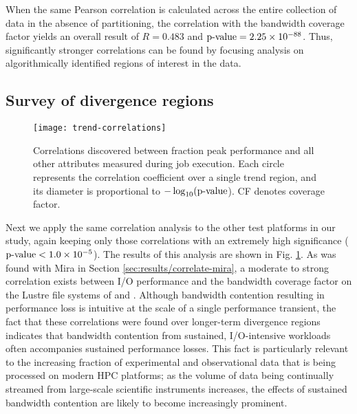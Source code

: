 When the same Pearson correlation is calculated across the entire collection
of \mira \mirafsone data in the absence of partitioning, the correlation with the bandwidth coverage factor
yields an overall result of $R = 0.483$ and $\textup{p-value} =
2.25\times 10^{-88}$.  
Thus, significantly stronger correlations can be found by focusing analysis on algorithmically identified regions of
interest in the data.

\subsection{Survey of divergence regions} \label{sec:results/correlate-all}

\begin{figure}
    \centering
    \texttt{[image: trend-correlations]}
    \vspace{-.35in}
    \caption{Correlations discovered between fraction peak performance and all other attributes measured during job execution.
    Each circle represents the correlation coefficient over a single trend region, and its diameter is proportional to $-\log_{10}(\textup{p-value}$).
    CF denotes coverage factor.}
    \label{fig:trend-correlations}
    \vspace{-.15in}
\end{figure}

Next we apply the same correlation analysis to the other test platforms in our study, again  keeping only those correlations with an extremely high significance ($\textup{p-value} < {1.0 \times 10^{-5}}$). The results of this analysis are shown in Fig. \ref{fig:trend-correlations}.
As was found with Mira in Section \ref{sec:results/correlate-mira}, a moderate to strong correlation exists between I/O performance and the bandwidth coverage factor on the Lustre file systems of \cori and \edison.
Although bandwidth contention resulting in performance loss is intuitive at the scale of a single performance transient, the fact that these correlations were found over longer-term divergence regions indicates that bandwidth contention from sustained, I/O-intensive workloads often accompanies sustained performance losses.
This fact is particularly relevant to the increasing fraction of experimental and observational data that is being processed on modern HPC platforms; as the volume of data being continually streamed from large-scale scientific instruments increases, the effects of sustained bandwidth contention are likely to become increasingly prominent.

